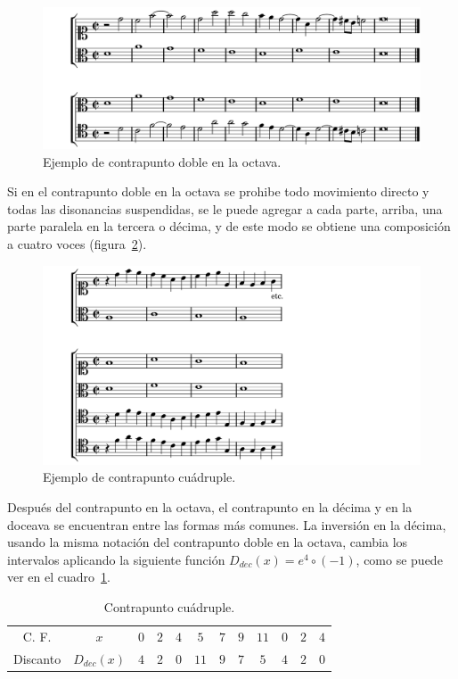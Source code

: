 \documentclass[letterpaper,12pt]{book}
\theoremstyle{definition} \newtheorem{Def}{Definición}[chapter]
\theoremstyle{definition} \newtheorem{Teo}{Teorema}[chapter]
\theoremstyle{definition} \newtheorem{Pro}{Proposición}[chapter]
\theoremstyle{definition} \newtheorem{Lema}{Lema}[chapter]
\begin{document}
\begin{figure}[h]
\centering
\includegraphics[angle=0, width=1\textwidth]{Doble8.png}
\caption{\label{Doble8}Ejemplo de contrapunto doble en la octava.}
\end{figure}

Si en el contrapunto doble en la octava se prohibe todo movimiento directo y todas las disonancias suspendidas, se le puede agregar a cada parte, arriba, una parte paralela en la tercera o décima, y de este modo se obtiene una composición a cuatro voces (figura~\ref{Cuadruple}).

\begin{figure}[h]
\centering
\includegraphics[angle=0, width=1\textwidth]{Cuadruple.png}
\caption{\label{Cuadruple}Ejemplo de contrapunto cuádruple.}
\end{figure}

Después del contrapunto en la octava, el contrapunto en la décima y en la doceava se encuentran entre las formas más comunes. La inversión en la décima, usando la misma notación del contrapunto doble en la octava, cambia los intervalos aplicando la siguiente función $D_{dec}(x)=e^4 \circ (-1)$, como se puede ver en el cuadro~\ref{CuadroCuadruple}.

\begin{table}[h]
\centering
\begin{tabular}{| c c c c c c c c c c c c|}
\hline
C. F. & $x$ & $0$ & $2$ & $4$ & $5$ & $7$ & $9$ & $11$ & $0$ & $2$ & $4$\\
Discanto & $D_{dec}(x)$ & $4$ & $2$ & $0$ & $11$ & $9$ & $7$ & $5$ & $4$ & $2$ & $0$\\ 
\hline
\end{tabular}
\caption{\label{CuadroCuadruple}Contrapunto cuádruple.} 
\end{table}
\end{document}
